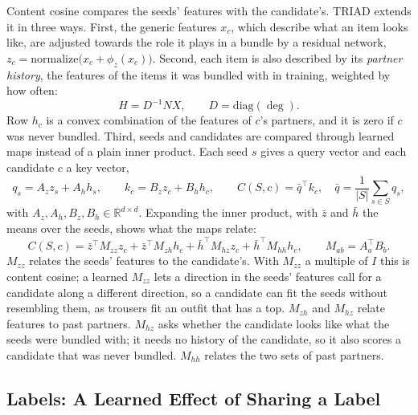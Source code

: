 \documentclass[runningheads]{llncs}
\newcommand{\R}{\mathbb{R}}
\begin{document}
Content cosine compares the seeds' features with the candidate's. TRIAD extends it in three ways. First, the generic
features $x_c$, which describe what an item looks like, are adjusted towards the role it plays in a bundle by a
residual network, $z_c=\mathrm{normalize}\big(x_c+\phi_z(x_c)\big)$. Second, each item is also described by its
\emph{partner history}, the features of the items it was bundled with in training, weighted by how often:
\begin{equation}
H=D^{-1}NX,\qquad D=\mathrm{diag}(\deg).
\end{equation}
Row $h_c$ is a convex combination of the features of $c$'s partners, and it is zero if $c$ was never bundled. Third,
seeds and candidates are compared through learned maps instead of a plain inner product. Each seed $s$ gives a query
vector and each candidate $c$ a key vector,
\begin{equation}
q_s=A_z z_s+A_h h_s,\qquad k_c=B_z z_c+B_h h_c,\qquad
C(S,c)=\bar q^{\top}k_c,\quad \bar q=\frac{1}{|S|}\sum_{s\in S}q_s,
\end{equation}
with $A_z,A_h,B_z,B_h\in\R^{d\times d}$. Expanding the inner product, with $\bar z$ and $\bar h$ the means over the
seeds, shows what the maps relate:
\begin{equation}
C(S,c)=\bar z^{\top}M_{zz}z_c+\bar z^{\top}M_{zh}h_c+\bar h^{\top}M_{hz}z_c+\bar h^{\top}M_{hh}h_c,
\qquad M_{ab}=A_a^{\top}B_b .
\end{equation}
$M_{zz}$ relates the seeds' features to the candidate's. With $M_{zz}$ a multiple of $I$ this is content cosine; a
learned $M_{zz}$ lets a direction in the seeds' features call for a candidate along a different direction, so a
candidate can fit the seeds without resembling them, as trousers fit an outfit that has a top. $M_{zh}$ and $M_{hz}$
relate features to past partners. $M_{hz}$ asks whether the candidate looks like what the seeds were bundled with; it
needs no history of the candidate, so it also scores a candidate that was never bundled. $M_{hh}$ relates the two sets
of past partners.

\subsection{Labels: A Learned Effect of Sharing a Label}
\end{document}
